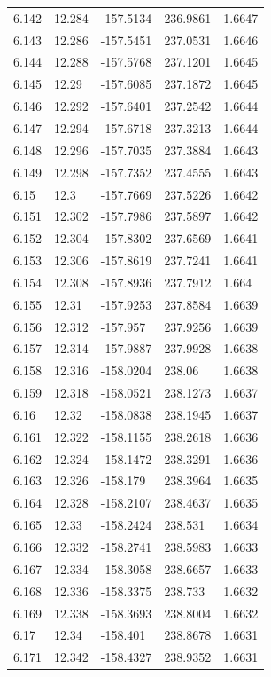 \begin{tabular}{lllll}
6.142 & 12.284 & -157.5134 & 236.9861 & 1.6647 \\
6.143 & 12.286 & -157.5451 & 237.0531 & 1.6646 \\
6.144 & 12.288 & -157.5768 & 237.1201 & 1.6645 \\
6.145 & 12.29 & -157.6085 & 237.1872 & 1.6645 \\
6.146 & 12.292 & -157.6401 & 237.2542 & 1.6644 \\
6.147 & 12.294 & -157.6718 & 237.3213 & 1.6644 \\
6.148 & 12.296 & -157.7035 & 237.3884 & 1.6643 \\
6.149 & 12.298 & -157.7352 & 237.4555 & 1.6643 \\
6.15 & 12.3 & -157.7669 & 237.5226 & 1.6642 \\
6.151 & 12.302 & -157.7986 & 237.5897 & 1.6642 \\
6.152 & 12.304 & -157.8302 & 237.6569 & 1.6641 \\
6.153 & 12.306 & -157.8619 & 237.7241 & 1.6641 \\
6.154 & 12.308 & -157.8936 & 237.7912 & 1.664 \\
6.155 & 12.31 & -157.9253 & 237.8584 & 1.6639 \\
6.156 & 12.312 & -157.957 & 237.9256 & 1.6639 \\
6.157 & 12.314 & -157.9887 & 237.9928 & 1.6638 \\
6.158 & 12.316 & -158.0204 & 238.06 & 1.6638 \\
6.159 & 12.318 & -158.0521 & 238.1273 & 1.6637 \\
6.16 & 12.32 & -158.0838 & 238.1945 & 1.6637 \\
6.161 & 12.322 & -158.1155 & 238.2618 & 1.6636 \\
6.162 & 12.324 & -158.1472 & 238.3291 & 1.6636 \\
6.163 & 12.326 & -158.179 & 238.3964 & 1.6635 \\
6.164 & 12.328 & -158.2107 & 238.4637 & 1.6635 \\
6.165 & 12.33 & -158.2424 & 238.531 & 1.6634 \\
6.166 & 12.332 & -158.2741 & 238.5983 & 1.6633 \\
6.167 & 12.334 & -158.3058 & 238.6657 & 1.6633 \\
6.168 & 12.336 & -158.3375 & 238.733 & 1.6632 \\
6.169 & 12.338 & -158.3693 & 238.8004 & 1.6632 \\
6.17 & 12.34 & -158.401 & 238.8678 & 1.6631 \\
6.171 & 12.342 & -158.4327 & 238.9352 & 1.6631 \\

\end{tabular}
